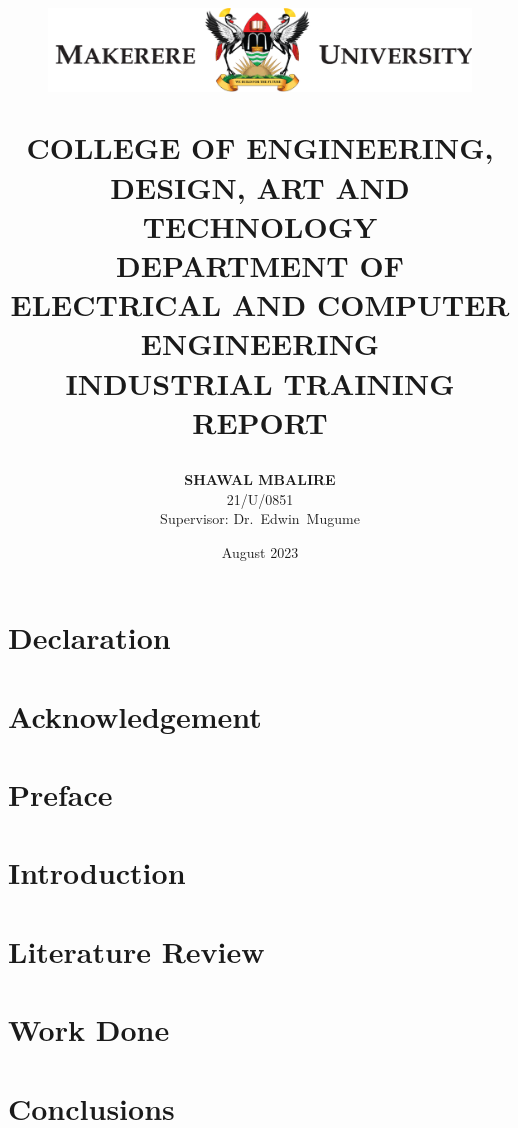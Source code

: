 \documentclass[12pt,a4paper]{report}
\title{
    \begin{figure}[H]
        \centering
        \includegraphics{images/mak_logo.png}
    \end{figure}
    \vspace{20pt}
    \normalsize COLLEGE OF ENGINEERING, DESIGN, ART AND TECHNOLOGY\vspace{15pt}\\
    DEPARTMENT OF ELECTRICAL AND COMPUTER ENGINEERING\\
    \vspace{50pt}
    \textbf{{\large INDUSTRIAL TRAINING REPORT}}
}
\author{
    \normalsize\textbf{SHAWAL MBALIRE} \\
    \normalsize 21/U/0851 \vspace{50pt} \\
    \normalsize Supervisor: Dr.\ Edwin\  Mugume\\
    \vspace{20pt}
}
\date{\normalsize \vspace{40pt} August 2023}
\begin{document}
    \maketitle

    \chapter*{Declaration}
    

    \newpage
    \chapter*{Acknowledgement}
    

    \newpage
    \chapter*{Preface}
    

    \newpage
    \tableofcontents

    \newpage
    \listoffigures

    \newpage
    \listoftables

    \chapter{Introduction}
    


    \newpage
    \chapter{Literature Review}
    

    \newpage
    \chapter{Work Done}
    

    \newpage
    \chapter{Conclusions}
    

    \newpage
    
    
\end{document}
